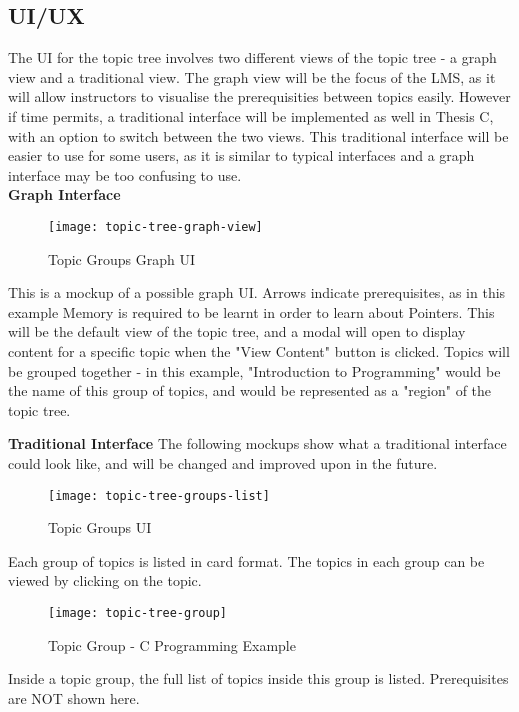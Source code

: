 \subsection{UI/UX}
The UI for the topic tree involves two different views of the topic tree - a graph view and a traditional view. The graph view will be the focus of the LMS, as it will allow instructors to visualise the prerequisities between topics easily. However if time permits, a traditional interface will be implemented as well in Thesis C, with an option to switch between the two views. This traditional interface will be easier to use for some users, as it is similar to typical interfaces and a graph interface may be too confusing to use.\\

\textbf{Graph Interface}

\begin{figure}[h!]
    \centering
    \texttt{[image: topic-tree-graph-view]}
    \caption{Topic Groups Graph UI}
\end{figure}

This is a mockup of a possible graph UI. Arrows indicate prerequisites, as in this example Memory is required to be learnt in order to learn about Pointers. This will be the default view of the topic tree, and a modal will open to display content for a specific topic when the "View Content" button is clicked. Topics will be grouped together - in this example, "Introduction to Programming" would be the name of this group of topics, and would be represented as a "region" of the topic tree.

\textbf{Traditional Interface}
The following mockups show what a traditional interface could look like, and will be changed and improved upon in the future.\\
\begin{figure}[h!]
    \centering
    \texttt{[image: topic-tree-groups-list]}
    \caption{Topic Groups UI}
\end{figure}

Each group of topics is listed in card format. The topics in each group can be viewed by clicking on the topic.\\

\begin{figure}[h!]
    \centering
    \texttt{[image: topic-tree-group]}
    \caption{Topic Group - C Programming Example}
\end{figure}
\newpage

Inside a topic group, the full list of topics inside this group is listed. Prerequisites are NOT shown here. \\


